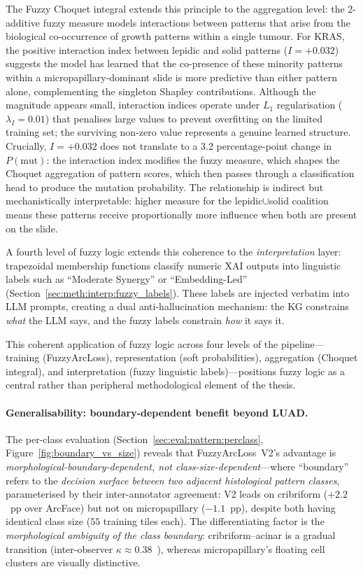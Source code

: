 The Fuzzy Choquet integral extends this principle to the aggregation level: the 2-additive fuzzy measure models interactions between patterns that arise from the biological co-occurrence of growth patterns within a single tumour.
For KRAS, the positive interaction index between lepidic and solid patterns ($I = +0.032$) suggests the model has learned that the co-presence of these minority patterns within a micropapillary-dominant slide is more predictive than either pattern alone, complementing the singleton Shapley contributions.
Although the magnitude appears small, interaction indices operate under $L_1$ regularisation ($\lambda_I = 0.01$) that penalises large values to prevent overfitting on the limited training set; the surviving non-zero value represents a genuine learned structure.
Crucially, $I = +0.032$ does not translate to a 3.2 percentage-point change in $P(\text{mut})$: the interaction index modifies the fuzzy measure, which shapes the Choquet aggregation of pattern scores, which then passes through a classification head to produce the mutation probability.
The relationship is indirect but mechanistically interpretable: higher measure for the lepidic$\cup$solid coalition means these patterns receive proportionally more influence when both are present on the slide.

A fourth level of fuzzy logic extends this coherence to the
\emph{interpretation} layer: trapezoidal membership functions classify
numeric XAI outputs into linguistic labels such as ``Moderate Synergy''
or ``Embedding-Led'' (Section~\ref{sec:meth:interp:fuzzy_labels}).
These labels are injected verbatim into LLM prompts, creating a dual
anti-hallucination mechanism: the KG constrains \emph{what} the LLM
says, and the fuzzy labels constrain \emph{how} it says it.

This coherent application of fuzzy logic across four levels of the
pipeline---training (FuzzyArcLoss), representation (soft
probabilities), aggregation (Choquet integral), and interpretation
(fuzzy linguistic labels)---positions fuzzy logic as a central rather
than peripheral methodological element of the thesis.

\paragraph{Generalisability: boundary-dependent benefit beyond LUAD.}
The per-class evaluation (Section~\ref{sec:eval:pattern:perclass},
Figure~\ref{fig:boundary_vs_size}) reveals that FuzzyArcLoss~V2's
advantage is
\emph{morphological-boundary-dependent, not
class-size-dependent}---where ``boundary'' refers to the
\emph{decision surface between two adjacent histological
pattern classes}, parameterised by their inter-annotator
agreement: V2 leads on cribriform ($+2.2$~pp over ArcFace) but
not on micropapillary ($-1.1$~pp), despite both having identical
class size ($55$ training tiles each).
The differentiating factor is the \emph{morphological ambiguity of the
class boundary}: cribriform--acinar is a gradual transition
(inter-observer $\kappa \approx 0.38$~\cite{thunnissen2012reproducibility}),
whereas micropapillary's floating cell clusters are visually
distinctive.

